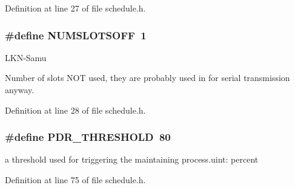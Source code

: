 Definition at line 27 of file schedule.\+h.

\subsubsection[{\texorpdfstring{N\+U\+M\+S\+L\+O\+T\+S\+O\+FF}{NUMSLOTSOFF}}]{\setlength{\rightskip}{0pt plus 5cm}\#define N\+U\+M\+S\+L\+O\+T\+S\+O\+FF~1}\hypertarget{group___schedule_ga9fd457940c2d1313fb347b5fd32d2105}{}\label{group___schedule_ga9fd457940c2d1313fb347b5fd32d2105}
\begin{DoxyRefDesc}{L\+K\+N-\/\+Samu}
\item[\hyperlink{_l_k_n_code_edits__LKN_code_edits000007}{L\+K\+N-\/\+Samu}]Number of slots N\+OT used, they are probably used in for serial transmission anyway. \end{DoxyRefDesc}


Definition at line 28 of file schedule.\+h.

\subsubsection[{\texorpdfstring{P\+D\+R\+\_\+\+T\+H\+R\+E\+S\+H\+O\+LD}{PDR_THRESHOLD}}]{\setlength{\rightskip}{0pt plus 5cm}\#define P\+D\+R\+\_\+\+T\+H\+R\+E\+S\+H\+O\+LD~80}\hypertarget{group___schedule_ga120d77f8a5101329b471874495b73942}{}\label{group___schedule_ga120d77f8a5101329b471874495b73942}


a threshold used for triggering the maintaining process.\+uint\+: percent 



Definition at line 75 of file schedule.\+h.

